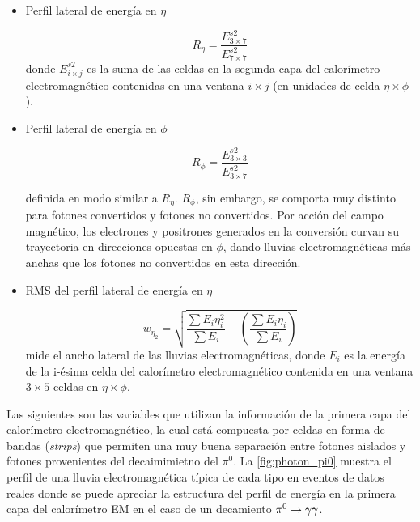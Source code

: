 \begin{itemize}\itemsep0.2cm\parskip0.2cm
\item Perfil lateral de energía en $\eta$

  \begin{equation}
    R_\eta = \frac{E^{s2}_{3\times 7}}{E^{s2}_{7\times 7}}
  \end{equation}
%
  donde $E^{s2}_{i\times j}$ es la suma de las celdas en la segunda capa del calorímetro
  electromagnético contenidas en una ventana $i \times j$ (en unidades de celda $\eta \times \phi$).

\item Perfil lateral de energía en $\phi$

  \begin{equation}
    R_\phi = \frac{E^{s2}_{3\times 3}}{E^{s2}_{3\times 7}}
  \end{equation}

  definida en modo similar a $R_\eta$.
  $R_\phi$, sin embargo, se comporta muy distinto para fotones convertidos y
  fotones no convertidos. Por acción del campo magnético, los electrones y positrones
  generados en la conversión curvan su trayectoria en direcciones opuestas en $\phi$,
  dando lluvias electromagnéticas más anchas que los fotones no convertidos en esta dirección.


  \item RMS del perfil lateral de energía en $\eta$

  \begin{equation}
    w_{\eta_2} = \sqrt{ \frac{\sum E_i \eta_i^2}{\sum E_i} - \left( \frac{\sum E_i \eta_i}{\sum E_i} \right) }
  \end{equation}
  mide el ancho lateral de las lluvias electromagnéticas, donde $E_i$ es la energía de la i-ésima celda del
  calorímetro electromagnético contenida en una ventana $3 \times 5$ celdas en $\eta \times \phi$.
\end{itemize}

Las siguientes son las variables que utilizan la información de la primera capa
del calorímetro electromagnético, la cual está compuesta por celdas en forma de
bandas (\emph{strips}) que permiten una muy buena separación entre fotones aislados y
fotones provenientes del decaimimietno del $\pi^0$. La \cref{fig:photon_pi0}
muestra el perfil de una lluvia electromagnética típica de cada tipo en eventos
de datos reales donde se puede apreciar la estructura del perfil de energía en
la primera capa del calorímetro EM en el caso de un decamiento $\pi^0 \to \gam\gam$.


